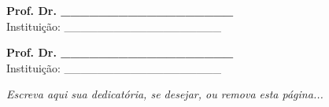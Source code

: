 \documentclass[
    12pt,                %
    oneside,            %
    a4paper,            %
    english,            %
    brazil                %
    ]{abntex2ppgsi}
\begin{document}
\begin{folhadeaprovacao}
\begin{center}
\vspace*{2cm}

\textbf{Prof. Dr. \_\_\_\_\_\_\_\_\_\_\_\_\_\_\_\_\_\_}
\\ Instituição: \_\_\_\_\_\_\_\_\_\_\_\_\_\_\_\_\_\_\_

\vspace*{2cm}

\textbf{Prof. Dr. \_\_\_\_\_\_\_\_\_\_\_\_\_\_\_\_\_\_}
\\ Instituição: \_\_\_\_\_\_\_\_\_\_\_\_\_\_\_\_\_\_\_

\end{center}

\end{folhadeaprovacao}

%
%
\begin{dedicatoria}
   \vspace*{\fill}
   \centering
   \noindent
   \textit{Escreva aqui sua dedicatória, se desejar, ou remova esta página...}
     \vspace*{\fill}
\end{dedicatoria}
\end{document}
